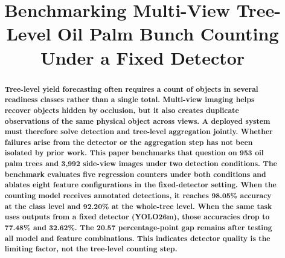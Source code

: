 ﻿\documentclass[conference]{IEEEtran}
\begin{document}
\title{Benchmarking Multi-View Tree-Level Oil Palm Bunch Counting Under a Fixed Detector}

\author{
}

\maketitle

\begin{abstract}
\bfseries Tree-level yield forecasting often requires a count of objects in several
readiness classes rather than a single total. Multi-view imaging helps recover
objects hidden by occlusion, but it also creates duplicate observations of the
same physical object across views. A deployed system must therefore solve
detection and tree-level aggregation jointly. Whether failures arise from the
detector or the aggregation step has not been isolated by prior work. This paper
benchmarks that question on 953 oil palm trees and 3,992 side-view images under
two detection conditions. The benchmark evaluates five regression counters under
both conditions and ablates eight feature configurations in the fixed-detector
setting. When the counting model receives annotated detections, it reaches
98.05\% accuracy at the class level and 92.20\% at the whole-tree level. When
the same task uses outputs from a fixed detector (YOLO26m), those accuracies drop to
77.48\% and 32.62\%. The 20.57 percentage-point gap remains after testing all
model and feature combinations. This indicates detector quality is the limiting
factor, not the tree-level counting step.
\end{abstract}
\end{document}
